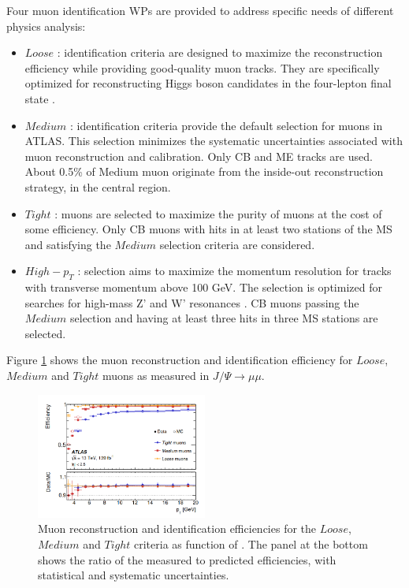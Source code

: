 Four muon identification WPs are provided to address specific needs of different physics analysis:
\begin{itemize}
    \item $Loose$ : identification criteria are designed to maximize the reconstruction efficiency while providing good-quality muon tracks. They are specifically optimized for reconstructing Higgs boson candidates in the four-lepton final state \cite{Higgs_4leptons}.
    \item $Medium$ : identification criteria provide the default selection for muons in ATLAS. This selection minimizes the systematic uncertainties associated with muon reconstruction and calibration. Only CB and ME tracks are used. About 0.5\% of Medium muon originate from the inside-out reconstruction strategy, in the central region. 
    \item $Tight$ : muons are selected to maximize the purity of muons at the cost of some efficiency. Only CB muons with hits in at least two stations of the MS and satisfying the $Medium$ selection criteria are considered.
    \item $High-p_T$ : selection aims to maximize the momentum resolution for tracks with transverse momentum above 100 GeV. The selection is optimized for searches for high-mass Z' and W' resonances \cite{W,dilepton}. CB muons passing the $Medium$ selection and having at least three hits in three MS stations are selected.
\end{itemize}
Figure \ref{fig:chap2:Objects:Muon:ID:Eff} shows the muon reconstruction and identification efficiency for $Loose$, $Medium$ and $Tight$ muons as measured in $J/\Psi\rightarrow\mu\mu$. 
\begin{figure}[htbp]
    \centering
    \includegraphics[width=0.5\textwidth]{Ch2/Img/Muon_ID_Eff.png}
    \caption{Muon reconstruction and identification efficiencies for the $Loose$, $Medium$ and $Tight$ criteria as function of \pT. The panel at the bottom shows the ratio of the measured to predicted efficiencies, with statistical and systematic uncertainties.}
    \label{fig:chap2:Objects:Muon:ID:Eff}
\end{figure}


